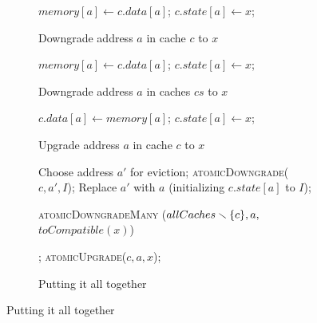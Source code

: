 
\begin{figure}

\begin{subfigure}{\linewidth}
\begin{boxedminipage}{\linewidth}
\begin{algorithmic}
      \State $memory[a] \gets c.data[a]$;
    \EndIf
    \State $c.state[a] \gets x$;
  \EndIf
\EndProc
\end{algorithmic}
\end{boxedminipage}
\caption{Downgrade address $a$ in cache $c$ to $x$}
\label{atomicDowngrade}
\end{subfigure}

\begin{subfigure}{\linewidth}
\begin{boxedminipage}{\linewidth}
\begin{algorithmic}
      \State $memory[a] \gets c.data[a]$;
    \EndIf
    \State $c.state[a] \gets x$;
  \EndFor
\EndProc
\end{algorithmic}
\end{boxedminipage}
\caption{Downgrade address $a$ in caches $cs$ to $x$}
\label{atomicManyDowngrade}
\end{subfigure}

\begin{subfigure}{\linewidth}
\begin{boxedminipage}{\linewidth}
\begin{algorithmic}
      \State $c.data[a] \gets memory[a]$;
    \EndIf
    \State $c.state[a] \gets x$;
  \EndIf
\EndProc
\end{algorithmic}
\end{boxedminipage}
\caption{Upgrade address $a$ in cache $c$ to $x$}
\label{atomicUpgrade}
\end{subfigure}

\begin{subfigure}{\linewidth}
\begin{boxedminipage}{\linewidth}
\begin{algorithmic}
    \State Choose address $a'$ for eviction;
    \State \call{} {\textsc{atomicDowngrade}($c, a', I$)};
    \State Replace $a'$ with $a$ (initializing $c.state[a]$ to $I$);
  \EndIf
  \State \call{} \parbox[t]{\dimexpr\linewidth-\algorithmicindent}
	{\textsc{atomicDowngradeMany}
            ($\newline allCaches \smallsetminus \{c\}, a, $ $toCompatible(x)$)};
\State \call{} \textsc{atomicUpgrade}($c, a, x$);
\EndIf
\end{algorithmic}
\end{boxedminipage}
\caption{Putting it all together}
\label{atomicPutting}
\end{subfigure}


\end{figure}
